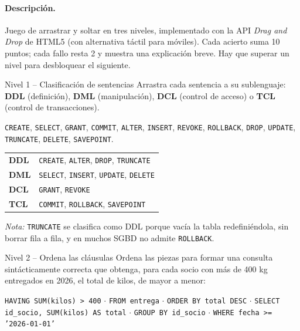 \documentclass[11pt,a4paper]{article}
\begin{document}
\paragraph{Descripción.} Juego de arrastrar y soltar en tres niveles, implementado con la API
\emph{Drag and Drop} de HTML5 (con alternativa táctil para móviles). Cada acierto suma 10
puntos; cada fallo resta 2 y muestra una explicación breve. Hay que superar un nivel para
desbloquear el siguiente.

\begin{reto}{Nivel 1 -- Clasificación de sentencias}
Arrastra cada sentencia a su sublenguaje: \textbf{DDL} (definición), \textbf{DML}
(manipulación), \textbf{DCL} (control de acceso) o \textbf{TCL} (control de transacciones).

\texttt{CREATE}, \texttt{SELECT}, \texttt{GRANT}, \texttt{COMMIT}, \texttt{ALTER},
\texttt{INSERT}, \texttt{REVOKE}, \texttt{ROLLBACK}, \texttt{DROP}, \texttt{UPDATE},
\texttt{TRUNCATE}, \texttt{DELETE}, \texttt{SAVEPOINT}.
\end{reto}

\begin{solucion}
\begin{tabularx}{\linewidth}{@{}>{\bfseries}lX@{}}
DDL & \texttt{CREATE}, \texttt{ALTER}, \texttt{DROP}, \texttt{TRUNCATE} \\
DML & \texttt{SELECT}, \texttt{INSERT}, \texttt{UPDATE}, \texttt{DELETE} \\
DCL & \texttt{GRANT}, \texttt{REVOKE} \\
TCL & \texttt{COMMIT}, \texttt{ROLLBACK}, \texttt{SAVEPOINT} \\
\end{tabularx}

\smallskip
\emph{Nota:} \texttt{TRUNCATE} se clasifica como DDL porque vacía la tabla
redefiniéndola, sin borrar fila a fila, y en muchos SGBD no admite \texttt{ROLLBACK}.
\end{solucion}

\begin{reto}{Nivel 2 -- Ordena las cláusulas}
Ordena las piezas para formar una consulta sintácticamente correcta que obtenga, para
cada socio con más de 400 kg entregados en 2026, el total de kilos, de mayor a menor:

\texttt{HAVING SUM(kilos) > 400} $\cdot$ \texttt{FROM entrega} $\cdot$
\texttt{ORDER BY total DESC} $\cdot$ \texttt{SELECT id\_socio, SUM(kilos) AS total} $\cdot$
\texttt{GROUP BY id\_socio} $\cdot$ \texttt{WHERE fecha >= '2026-01-01'}
\end{reto}
\end{document}
